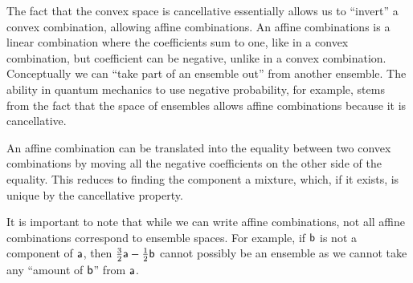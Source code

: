 The fact that the convex space is cancellative essentially allows us to ``invert'' a convex combination, allowing affine combinations. An affine combinations is a linear combination where the coefficients sum to one, like in a convex combination, but coefficient can be negative, unlike in a convex combination. Conceptually we can ``take part of an ensemble out'' from another ensemble. The ability in quantum mechanics to use negative probability, for example, stems from the fact that the space of ensembles allows affine combinations because it is cancellative.

An affine combination can be translated into the equality between two convex combinations by moving all the negative coefficients on the other side of the equality. This reduces to finding the component a mixture, which, if it exists, is unique by the cancellative property.

It is important to note that while we can write affine combinations, not all affine combinations correspond to ensemble spaces. For example, if $\ens[b]$ is not a component of $\ens[a]$, then $\frac{3}{2}\ens[a] - \frac{1}{2} \ens[b]$ cannot possibly be an ensemble as we cannot take any ``amount of $\ens[b]$'' from $\ens[a]$.

